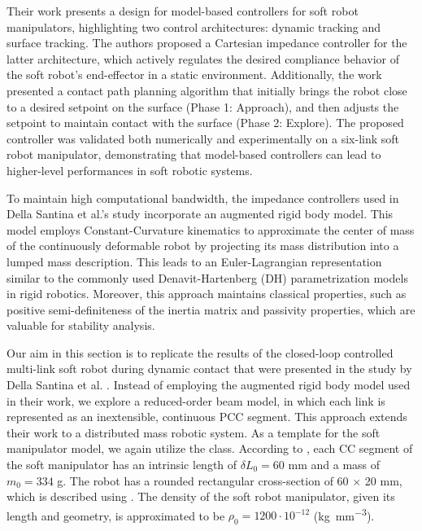 Their work presents a design for model-based controllers for soft robot manipulators, highlighting two control architectures: dynamic tracking and surface tracking. The authors proposed a Cartesian impedance controller for the latter architecture, which actively regulates the desired compliance behavior of the soft robot's end-effector in a static environment. Additionally, the work presented a contact path planning algorithm that initially brings the robot close to a desired setpoint on the surface (Phase 1: Approach), and then adjusts the setpoint to maintain contact with the surface (Phase 2: Explore). The proposed controller was validated both numerically and experimentally on a six-link soft robot manipulator, demonstrating that model-based controllers can lead to higher-level performances in soft robotic systems.

To maintain high computational bandwidth, the impedance controllers used in Della Santina et al.'s study \cite{DellaSantina2020a} incorporate an augmented rigid body model. This model employs Constant-Curvature kinematics to approximate the center of mass of the continuously deformable robot by projecting its mass distribution into a lumped mass description. This leads to an Euler-Lagrangian representation similar to the commonly used Denavit-Hartenberg (DH) parametrization models in rigid robotics. Moreover, this approach maintains classical properties, such as positive semi-definiteness of the inertia matrix and passivity properties, which are valuable for stability analysis.

Our aim in this section is to replicate the results of the closed-loop controlled multi-link soft robot during dynamic contact that were presented in the study by Della Santina et al. \cite{DellaSantina2020a}. Instead of employing the augmented rigid body model used in their work, we explore a reduced-order beam model, in which each link is represented as an inextensible, continuous PCC segment. This approach extends their work to a distributed mass robotic system. As a template for the soft manipulator model, we again utilize the  class. According to \cite{DellaSantina2020a}, each CC segment of the soft manipulator has an intrinsic length of $\delta L_0 = 60$ mm and a mass of $m_0 = 334$ g. The robot has a rounded rectangular cross-section of 60 $\times$ 20 mm, which is described using . The density of the soft robot manipulator, given its length and geometry, is approximated to be $\rho_0 = 1200 \cdot 10^{-12}$ (\si{\kilo \gram \per \milli \metre \cubed}). 


